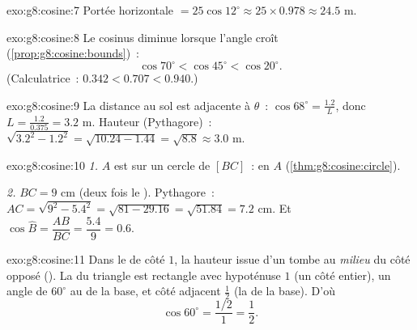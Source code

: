 \begin{solution}{exo:g8:cosine:7}
Portée horizontale $= 25 \cos 12^\circ \approx 25 \times 0.978 \approx
24.5$ m.
\end{solution}

\begin{solution}{exo:g8:cosine:8}
Le cosinus diminue lorsque l'angle croît
(\cref{prop:g8:cosine:bounds})~:
\[
\cos 70^\circ < \cos 45^\circ < \cos 20^\circ .
\]
(Calculatrice~: $0.342 < 0.707 < 0.940$.)
\end{solution}

\begin{solution}{exo:g8:cosine:9}
La distance au sol est adjacente à $\theta$~:
$\cos 68^\circ = \frac{1.2}{L}$, donc
$L = \frac{1.2}{0.375} = 3.2$ m. Hauteur (Pythagore)~:
$\sqrt{3.2^2 - 1.2^2} = \sqrt{10.24 - 1.44} = \sqrt{8.8} \approx 3.0$
m.
\end{solution}

\begin{solution}{exo:g8:cosine:10}
\emph{1.} $A$ est sur un cercle de  $[BC]$~:  en
$A$ (\cref{thm:g8:cosine:circle}).

\emph{2.} $BC = 9$ cm (deux fois le ). Pythagore~:
$AC = \sqrt{9^2 - 5.4^2} = \sqrt{81 - 29.16} = \sqrt{51.84} = 7.2$
cm. Et $\cos\widehat B = \dfrac{AB}{BC} = \dfrac{5.4}{9} = 0.6$.
\end{solution}

\begin{solution}{exo:g8:cosine:11}
Dans le  de côté $1$, la hauteur issue d'un
 tombe au \emph{milieu} du côté opposé (). La
 du triangle est rectangle avec hypoténuse $1$ (un côté
entier), un angle de $60^\circ$ au  de la base, et côté
adjacent $\frac12$ (la  de la base). D'où
\[
\cos 60^\circ = \frac{1/2}{1} = \frac12 .
\]
\end{solution}

